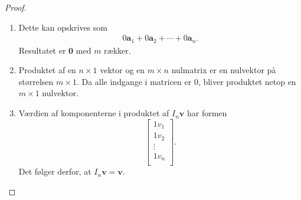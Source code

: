 \begin{proof}
\begin{enumerate}[label=(\alph*)]
\item Dette kan opskrives som
\begin{align*}
0\textbf{a}_1+0\textbf{a}_2+\cdots+0\textbf{a}_n.
\end{align*}
Resultatet er $\textbf{0}$ med $m$ rækker.
%
\item Produktet af en $n \times 1$ vektor og en $m \times n$ nulmatrix er en nulvektor på størrelsen $m \times 1$. Da alle indgange i matricen er $0$, bliver produktet netop en $m \times 1$ nulvektor. 
%
\item Værdien af komponenterne i produktet af $I_n\mathbf{v}$ har formen
$$
\begin{bmatrix}
1v_1 \\
1v_2 \\
\vdots \\
1v_n  \\
\end{bmatrix}.
$$
Det følger derfor, at $I_n\mathbf{v}=\textbf{v}$.
%
\end{enumerate}
\end{proof}